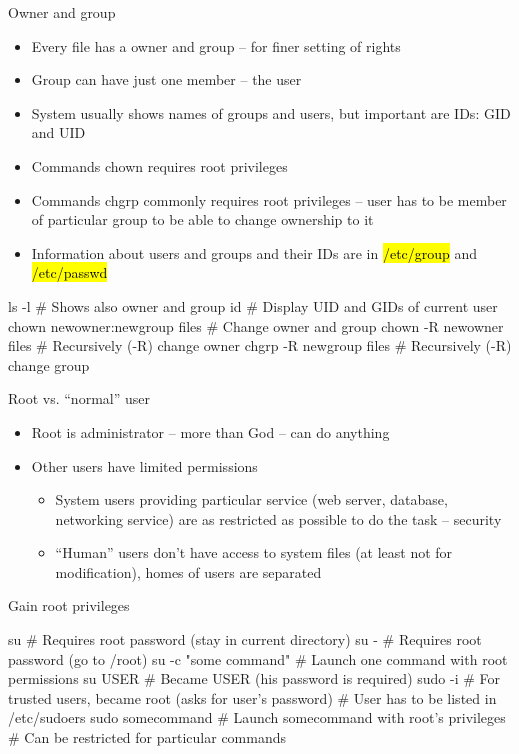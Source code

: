 \documentclass[compress, ucs, xelatex, 11pt, xcolor=svgnames,
  hyperref={
    bookmarks=true,
    unicode=true,
    colorlinks=true,
    pdftitle={Linux, command line and MetaCentrum},
    plainpages=false,
    pdfauthor={Vojtech Zeisek},
    pdfsubject={Course about use of Linux command line, writing shell scripts and using MetaCentrum of CESNET},
    pdfcreator={XeLaTeX},
    pdfkeywords={Linux, GNU, BASH, shell, command line, MetaCentrum},
    linkcolor=Red,
    anchorcolor=Blue,
    citecolor=Purple,
    filecolor=DodgerBlue,
    menucolor=DarkOrchid,
    urlcolor=DeepSkyBlue,
    pdftex},
  url={hyphens, lowtilde} %
  ]{beamer}
\renewcommand{\texttt}[1]{\hl{\ttfamily #1}}
\begin{document}
\begin{frame}[fragile]{Owner and group}
\begin{itemize}
  \item Every file has a owner and group -- for finer setting of rights
  \item Group can have just one member -- the user
  \item System usually shows names of groups and users, but important are IDs: GID and UID
  \item Commands chown requires root privileges
  \item Commands chgrp commonly requires root privileges -- user has to be member of particular group to be able to change ownership to it
  \item Information about users and groups and their IDs are in \texttt{/etc/group} and \texttt{/etc/passwd}
\end{itemize}
  \begin{bashcode}
    ls -l # Shows also owner and group
    id # Display UID and GIDs of current user
    chown newowner:newgroup files # Change owner and group
    chown -R newowner files # Recursively (-R) change owner
    chgrp -R newgroup files # Recursively (-R) change group
  \end{bashcode}
\end{frame}

\begin{frame}[fragile]{Root vs. ``normal'' user}
\begin{itemize}
  \item Root is administrator -- more than God -- can do anything
  \item Other users have limited permissions
  \begin{itemize}
    \item System users providing particular service (web server, database, networking service) are as restricted as possible to do the task -- security
    \item ``Human'' users don't have access to system files (at least not for modification), homes of users are separated
  \end{itemize}
\end{itemize}
Gain root privileges
  \begin{bashcode}
    su # Requires root password (stay in current directory)
    su - # Requires root password (go to /root)
    su -c "some command" # Launch one command with root permissions
    su USER # Became USER (his password is required)
    sudo -i # For trusted users, became root (asks for user's password)
            # User has to be listed in /etc/sudoers
    sudo somecommand # Launch somecommand with root's privileges
                     # Can be restricted for particular commands
  \end{bashcode}
\end{frame}
\end{document}
